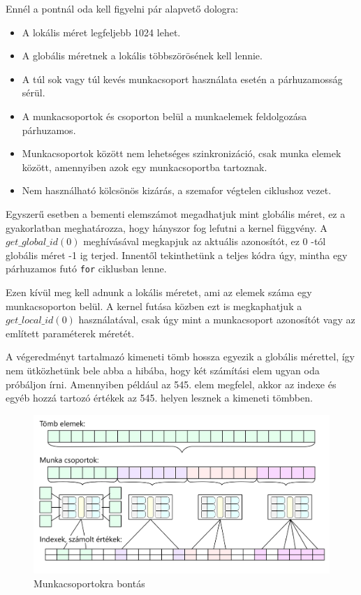 Ennél a pontnál oda kell figyelni pár alapvető dologra:
\begin{itemize}
\item A lokális méret legfeljebb 1024 lehet.
\item A globális méretnek a lokális többszörösének kell lennie.
\item A túl sok vagy túl kevés munkacsoport használata esetén a párhuzamosság sérül.
\item A munkacsoportok és csoporton belül a munkaelemek feldolgozása párhuzamos.
\item Munkacsoportok között nem lehetséges szinkronizáció, csak munka elemek között, amennyiben azok egy munkacsoportba tartoznak.
\item Nem használható kölcsönös kizárás, a szemafor végtelen ciklushoz vezet.
\end{itemize}


Egyszerű esetben a bementi elemszámot megadhatjuk mint globális méret, ez a gyakorlatban meghatározza, hogy hányszor fog lefutni a kernel függvény. A $get\_global\_id(0)$ meghívásával megkapjuk az aktuális azonosítót, ez 0 -tól globális méret -1 ig terjed. Innentől tekinthetünk a teljes kódra úgy, mintha egy párhuzamos futó \texttt{for} ciklusban lenne.

Ezen kívül meg kell adnunk a lokális méretet, ami az elemek száma egy munkacsoporton belül. A kernel futása közben ezt is megkaphatjuk a $get\_local\_id(0)$ használatával, csak úgy mint a munkacsoport azonosítót vagy az említett paraméterek méretét.

A végeredményt tartalmazó kimeneti tömb hossza egyezik a globális mérettel, így nem ütközhetünk bele abba a hibába, hogy két számítási elem ugyan oda próbáljon írni. Amennyiben például az 545. elem megfelel, akkor az indexe és egyéb hozzá tartozó értékek az 545. helyen lesznek a kimeneti tömbben.

\begin{figure}[h!]
\centering
\includegraphics[width=\textwidth]{images/workgroups_black.png}
\caption{Munkacsoportokra bontás}
\label{fig:opencl}
\end{figure}

